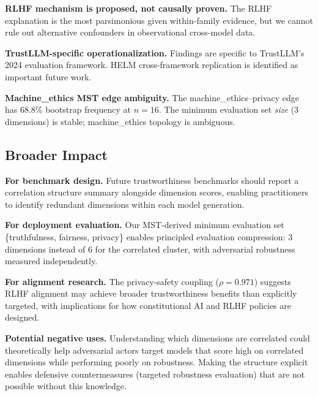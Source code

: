 \textbf{RLHF mechanism is proposed, not causally proven.} The RLHF explanation is the most parsimonious given within-family evidence, but we cannot rule out alternative confounders in observational cross-model data.

\textbf{TrustLLM-specific operationalization.} Findings are specific to TrustLLM's 2024 evaluation framework. HELM cross-framework replication is identified as important future work.

\textbf{Machine\_ethics MST edge ambiguity.} The machine\_ethics--privacy edge has 68.8\% bootstrap frequency at $n=16$. The minimum evaluation set \emph{size} (3 dimensions) is stable; machine\_ethics topology is ambiguous.

\subsection{Broader Impact}

\textbf{For benchmark design.} Future trustworthiness benchmarks should report a correlation structure summary alongside dimension scores, enabling practitioners to identify redundant dimensions within each model generation.

\textbf{For deployment evaluation.} Our MST-derived minimum evaluation set \{truthfulness, fairness, privacy\} enables principled evaluation compression: 3 dimensions instead of 6 for the correlated cluster, with adversarial robustness measured independently.

\textbf{For alignment research.} The privacy-safety coupling ($\rho=0.971$) suggests RLHF alignment may achieve broader trustworthiness benefits than explicitly targeted, with implications for how constitutional AI and RLHF policies are designed.

\textbf{Potential negative uses.} Understanding which dimensions are correlated could theoretically help adversarial actors target models that score high on correlated dimensions while performing poorly on robustness. Making the structure explicit enables defensive countermeasures (targeted robustness evaluation) that are not possible without this knowledge.
